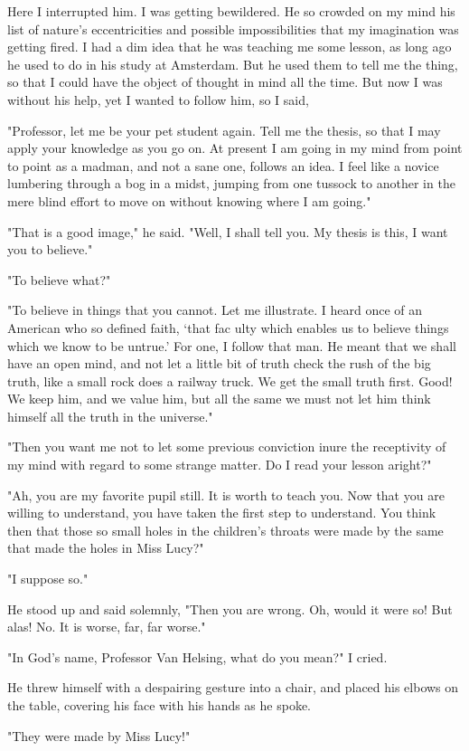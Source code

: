 Here I interrupted him. I was getting bewildered. He so crowded on my mind his list of nature's eccentricities and possible impossibilities that my imagination was getting fired. I had a dim idea that he was teaching me some lesson, as long ago he used to do in his study at Amsterdam. But he used them to tell me the thing, so that I could have the object of thought in mind all the time. But now I was without his help, yet I wanted to follow him, so I said, 

"Professor, let me be your pet student again. Tell me the thesis, so that I may apply your knowledge as you go on. At present I am going in my mind from point to point as a madman, and not a sane one, follows an idea. I feel like a novice lumbering through a bog in a midst, jumping from one tussock to another in the mere blind effort to move on without knowing where I am going." 

"That is a good image," he said. "Well, I shall tell you. My thesis is this, I want you to believe." 

"To believe what?" 

"To believe in things that you cannot. Let me illustrate. I heard once of an American who so defined faith, `that fac ulty which enables us to believe things which we know to be untrue.' For one, I follow that man. He meant that we shall have an open mind, and not let a little bit of truth check the rush of the big truth, like a small rock does a railway truck. We get the small truth first. Good! We keep him, and we value him, but all the same we must not let him think himself all the truth in the universe." 

"Then you want me not to let some previous conviction inure the receptivity of my mind with regard to some strange matter. Do I read your lesson aright?" 

"Ah, you are my favorite pupil still. It is worth to teach you. Now that you are willing to understand, you have taken the first step to understand. You think then that those so small holes in the children's throats were made by the same that made the holes in Miss Lucy?" 

"I suppose so." 

He stood up and said solemnly, "Then you are wrong. Oh, would it were so! But alas! No. It is worse, far, far worse." 

"In God's name, Professor Van Helsing, what do you mean?" I cried. 

He threw himself with a despairing gesture into a chair, and placed his elbows on the table, covering his face with his hands as he spoke. 

"They were made by Miss Lucy!" 
